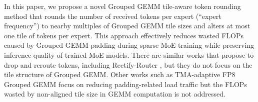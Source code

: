 

In this paper, we propose a novel Grouped GEMM tile-aware token rounding method that rounds the number of received tokens per expert (``expert frequency'') to nearby multiples of Grouped GEMM tile sizes and alters at most one tile of tokens per expert. This approach effectively reduces wasted FLOPs caused by Grouped GEMM padding during sparse MoE training while preserving inference quality of trained MoE models. There are similar works that propose to drop and reroute tokens, including Rectify-Router \citep{zeng2024turn}, but they do not focus on the tile structure of Grouped GEMM. Other works such as TMA-adaptive FP8 Grouped GEMM \citep{tmaadatpivefp8} focus on reducing padding-related load traffic but the FLOPs wasted by non-aligned tile size in GEMM computation is not addressed. 






